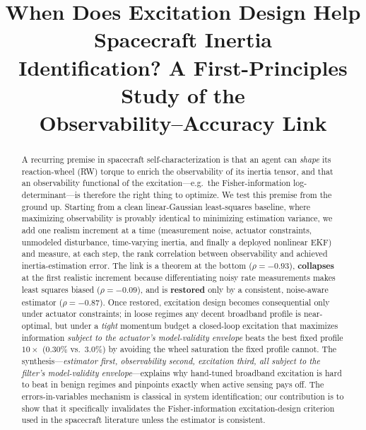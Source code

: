 \documentclass[conference]{IEEEtran}
\begin{document}
\title{When Does Excitation Design Help Spacecraft Inertia\\ Identification? A First-Principles Study of the\\ Observability--Accuracy Link}

\author{
}

\maketitle

\begin{abstract}
A recurring premise in spacecraft self-characterization is that an agent can \emph{shape} its reaction-wheel (RW) torque to enrich the observability of its inertia tensor, and that an observability functional of the excitation---e.g.\ the Fisher-information log-determinant---is therefore the right thing to optimize. We test this premise from the ground up. Starting from a clean linear-Gaussian least-squares baseline, where maximizing observability is provably identical to minimizing estimation variance, we add one realism increment at a time (measurement noise, actuator constraints, unmodeled disturbance, time-varying inertia, and finally a deployed nonlinear EKF) and measure, at each step, the rank correlation between observability and achieved inertia-estimation error. The link is a theorem at the bottom ($\rho=-0.93$), \textbf{collapses} at the first realistic increment because differentiating noisy rate measurements makes least squares biased ($\rho=-0.09$), and is \textbf{restored} only by a consistent, noise-aware estimator ($\rho=-0.87$). Once restored, excitation design becomes consequential only under actuator constraints; in loose regimes any decent broadband profile is near-optimal, but under a \emph{tight} momentum budget a closed-loop excitation that maximizes information \emph{subject to the actuator's model-validity envelope} beats the best fixed profile $10\times$ ($0.30\%$ vs.\ $3.0\%$) by avoiding the wheel saturation the fixed profile cannot. The synthesis---\emph{estimator first, observability second, excitation third, all subject to the filter's model-validity envelope}---explains why hand-tuned broadband excitation is hard to beat in benign regimes and pinpoints exactly when active sensing pays off. The errors-in-variables mechanism is classical in system identification; our contribution is to show that it specifically invalidates the Fisher-information excitation-design criterion used in the spacecraft literature unless the estimator is consistent.
\end{abstract}
\end{document}
